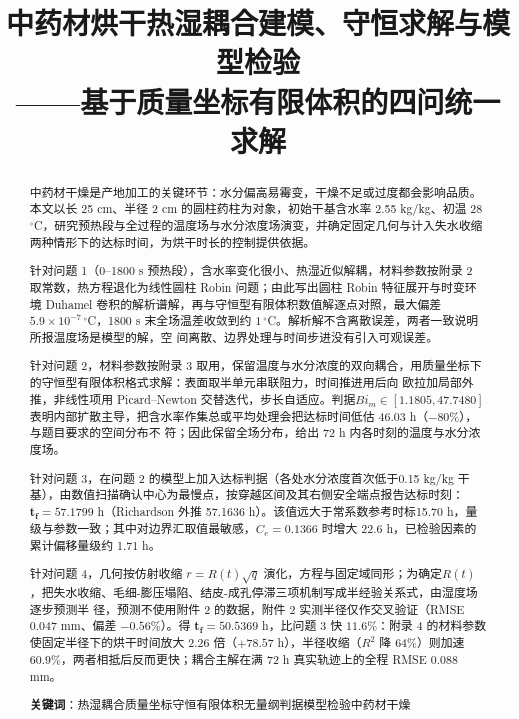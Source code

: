 \documentclass[12pt,a4paper]{ctexart}
\title{\textbf{中药材烘干热湿耦合建模、守恒求解与模型检验}\\[2pt]
——基于质量坐标有限体积的四问统一求解}
\author{}
\date{}
\numberwithin{equation}{section}
\begin{document}
\maketitle

\begin{abstract}

\noindent 中药材干燥是产地加工的关键环节：水分偏高易霉变，干燥不足或过度都会影响品质。本文以长 25 cm、半径 2 cm 的圆柱药柱为对象，初始干基含水率 2.55 kg/kg、初温 28
${}^\circ$C，研究预热段与全过程的温度场与水分浓度场演变，并确定固定几何与计入失水收缩两种情形下的达标时间，为烘干时长的控制提供依据。

\noindent 针对问题 1（0--1800 s 预热段），含水率变化很小、热湿近似解耦，材料参数按附录 2 取常数，热方程退化为线性圆柱 Robin 问题；由此写出圆柱 Robin 特征展开与时变环境 Duhamel
卷积的解析谱解，再与守恒型有限体积数值解逐点对照，最大偏差$5.9\times10^{-7}\,^{\circ}$C，1800 s 末全场温差收敛到约 $1\,^{\circ}$C。解析解不含离散误差，两者一致说明所报温度场是模型的解，空
间离散、边界处理与时间步进没有引入可观误差。

\noindent 针对问题 2，材料参数按附录 3 取用，保留温度与水分浓度的双向耦合，用质量坐标下的守恒型有限体积格式求解：表面取半单元串联阻力，时间推进用后向
欧拉加局部外推，非线性项用 Picard--Newton 交替迭代，步长自适应。判据$Bi_m\in[1.1805,47.7480]$ 表明内部扩散主导，把含水率作集总或平均处理会把达标时间低估 46.03 h（$-80\%$），与题目要求的空间分布不
符；因此保留全场分布，给出 72 h 内各时刻的温度与水分浓度场。

\noindent 针对问题 3，在问题 2 的模型上加入达标判据（各处水分浓度首次低于0.15 kg/kg 干基），由数值扫描确认中心为最慢点，按穿越区间及其右侧安全端点报告达标时刻：$\bm{t_f=57.1799}$ h（Richardson
外推 57.1636 h）。该值远大于常系数参考时标15.70 h，量级与参数一致；其中对边界汇取值最敏感，$C_e=0.1366$ 时增大 22.6 h，已检验因素的累计偏移量级约 1.71 h。

\noindent 针对问题 4，几何按仿射收缩 $r=R(t)\sqrt q$ 演化，方程与固定域同形；为确定$R(t)$，把失水收缩、毛细-膨压塌陷、结皮-成孔停滞三项机制写成半经验关系式，由湿度场逐步预测半
径，预测不使用附件 2 的数据，附件 2 实测半径仅作交叉验证（RMSE 0.047 mm、偏差 $-0.56\%$）。得 $\bm{t_f=50.5369}$ h，比问题 3 快 $11.6\%$：附录 4 的材料参数使固定半径下的烘干时间放大 $2.26$ 倍（$+78.57$ h），半径收缩（$R^2$ 降
64\%）则加速$60.9\%$，两者相抵后反而更快；耦合主解在满 72 h 真实轨迹上的全程 RMSE 0.088 mm。

\smallskip\noindent\textbf{关键词}：热湿耦合\enspace 质量坐标\enspace 守恒有限体积\enspace 无量纲判据\enspace 模型检验\enspace 中药材干燥
\end{abstract}
\end{document}
